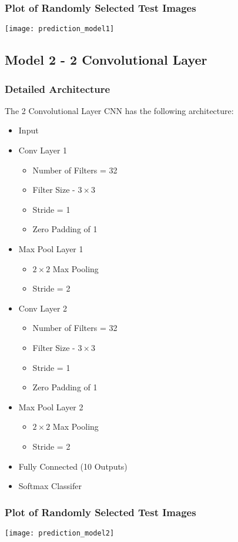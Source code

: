 \documentclass[a4paper]{article}
\begin{document}
\subsubsection{Plot of Randomly Selected Test Images}
\texttt{[image: prediction\_model1]}

\subsection{Model 2 - 2 Convolutional Layer}
\subsubsection{Detailed Architecture}
The 2 Convolutional Layer CNN has the following architecture:
\begin{itemize}
\item Input
\item Conv Layer 1
	\begin{itemize}
	\item Number of Filters = 32
	\item Filter Size - $3 \times 3$
    \item Stride = 1
    \item Zero Padding of 1
	\end{itemize}
\item Max Pool Layer 1
\begin{itemize}
\item $2\times2$ Max Pooling
\item Stride = 2
\end{itemize}
\item Conv Layer 2
	\begin{itemize}
	\item Number of Filters = 32
	\item Filter Size - $3 \times 3$
    \item Stride = 1
    \item Zero Padding of 1
	\end{itemize}
\item Max Pool Layer 2
\begin{itemize}
\item $2\times2$ Max Pooling
\item Stride = 2
\end{itemize}
\item Fully Connected (10 Outputs)
\item Softmax Classifer
\end{itemize}
\subsubsection{Plot of Randomly Selected Test Images}
\texttt{[image: prediction\_model2]}
\end{document}
